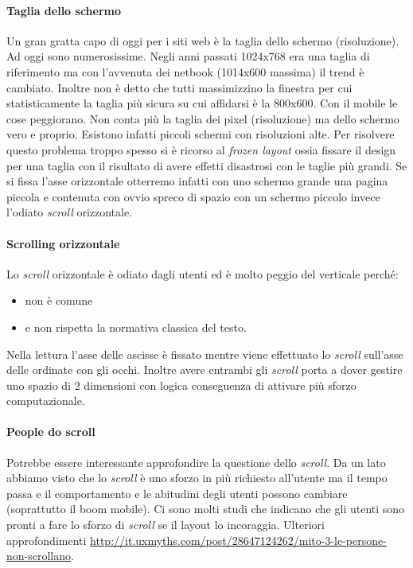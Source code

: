 			\paragraph{Taglia dello schermo}
				Un gran gratta capo di oggi per i siti web è la taglia dello schermo (risoluzione). Ad oggi sono numerosissime. Negli anni passati 1024x768 era una taglia di riferimento ma con l'avvenuta dei netbook (1014x600 massima) il trend è cambiato. Inoltre non è detto che tutti massimizzino la finestra per cui statisticamente la taglia più sicura su cui affidarsi è la 800x600. Con il mobile le cose peggiorano. Non conta più la taglia dei pixel (risoluzione) ma dello schermo vero e proprio. Esistono infatti piccoli schermi con risoluzioni alte.
				Per risolvere questo problema troppo spesso si è ricorso al \emph{frozen layout} ossia fissare il design per una taglia con il risultato di avere effetti disastrosi con le taglie più grandi. Se si fissa l'asse orizzontale otterremo infatti con uno schermo grande una pagina piccola e contenuta con ovvio spreco di spazio con un schermo piccolo invece l'odiato \emph{scroll} orizzontale.
				
			\paragraph{Scrolling orizzontale}
				Lo \emph{scroll} orizzontale è odiato dagli utenti ed è molto peggio del verticale perché:
				\begin{itemize}
					\item non è comune
					\item e non rispetta la normativa classica del testo.	
				\end{itemize}
				Nella lettura l'asse delle ascisse è fissato mentre viene effettuato lo \emph{scroll} sull'asse delle ordinate con gli occhi. Inoltre avere entrambi gli \emph{scroll} porta a dover gestire uno spazio di 2 dimensioni con logica conseguenza di attivare più sforzo computazionale.
			
			\paragraph{People do scroll}
				Potrebbe essere interessante approfondire la questione dello \emph{scroll}. Da un lato abbiamo visto che lo \emph{scroll} è uno sforzo in più richiesto all'utente ma il tempo passa e il comportamento e le abitudini degli utenti possono cambiare (soprattutto il boom mobile). Ci sono molti studi che indicano che gli utenti sono pronti a fare lo sforzo di \emph{scroll} se il layout lo incoraggia. Ulteriori approfondimenti \url{http://it.uxmyths.com/post/28647124262/mito-3-le-persone-non-scrollano}.
				
